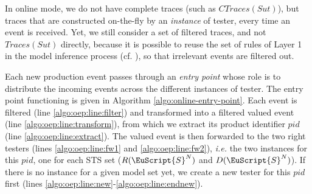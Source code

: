 In online mode, we do not have complete traces (such as
$CTraces({Sut})$), but traces that are constructed on-the-fly by
an \emph{instance} of tester, every time an event is received.
Yet, we still consider a set of filtered traces, and not
$Traces(Sut)$ directly, because it is possible to reuse the set
of rules of Layer 1 in the model inference process (cf.
), so that
irrelevant events are filtered out.

Each new production event passes through an \emph{entry point}
whose role is to distribute the incoming events across the
different instances of tester. The entry point functioning is
given in Algorithm \ref{algo:online-entry-point}. Each event is
filtered (line \ref{algo:oep:line:filter}) and transformed into a
filtered valued event (line \ref{algo:oep:line:transform}), from
which we extract its product identifier $pid$ (line
\ref{algo:oep:line:extract}).  The valued event is then forwarded
to the two right testers (lines \ref{algo:oep:line:fw1} and
\ref{algo:oep:line:fw2}), \emph{i.e.} the two instances for this
$pid$, one for each STS set ($R(\EuScript{S}^N)$ and
$D(\EuScript{S}^N)$).  If there is no instance for a given
model set yet, we create a new tester for this $pid$ first (lines
\ref{algo:oep:line:new}-\ref{algo:oep:line:endnew}).


